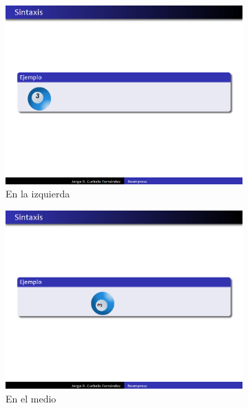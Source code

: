  		\begin{figure}[tb]
 			\centering
 			\begin{subfigure}[b]{0.3\textwidth}
 				\includegraphics[width=\textwidth]{img/ball-left}
 				\caption{En la izquierda}
 				\label{fig:ball_visual_a}	
 			\end{subfigure}
 			\hspace*{\fill}
 			\begin{subfigure}[b]{0.3\textwidth}
 				\includegraphics[width=\textwidth]{img/ball-middle}
 				\caption{En el medio}
 				\label{fig:ball_visual_b}	
 			\end{subfigure}
 			\hspace*{\fill}
 			\begin{subfigure}[b]{0.3\textwidth}

\end{subfigure}
\end{figure}
